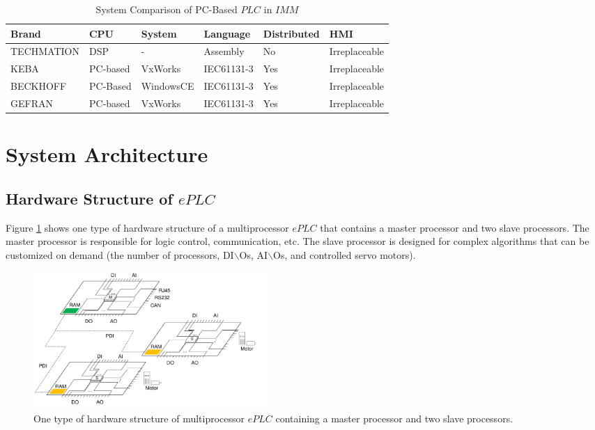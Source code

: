 \documentclass[journal,UTF8]{IEEEtran}
\begin{document}
	\begin{table}
		\scriptsize \caption{System Comparison of PC-Based $PLC$ in $IMM$}
		\label{table:IMMControllor}
		\begin{center}
			\renewcommand{\arraystretch}{1.4}
			\setlength\tabcolsep{3pt}
			\begin{tabular}{|p{1.6cm}|p{1cm}|p{1.2cm}|p{1.4cm}|p{1.1cm}|p{1.3cm}|}
				\hline
				Brand       & CPU       & System & Language       & Distributed & HMI\\
				\hline
				TECHMATION  & DSP       & -  & Assembly  &No           & Irreplaceable \\
				\hline
				KEBA        & PC-based  &VxWorks   & IEC61131-3   &Yes          & Irreplaceable\\
				\hline
				BECKHOFF    & PC-Based  &WindowsCE & IEC61131-3  &Yes          &Irreplaceable\\
				\hline
				GEFRAN      & PC-based  &VxWorks   &IEC61131-3     &Yes          &Irreplaceable\\
				\hline
			\end{tabular}
		\end{center}
	\end{table}
	\section{System Architecture}
	\label{MultiProcessorePLC}
	\subsection{Hardware Structure of $ePLC$}
	Figure \ref{fig:HardwareStructure} shows one type of hardware structure of a multiprocessor $ePLC$ that contains a master processor and two slave processors. The master processor is responsible for logic control, communication, etc. The slave processor is designed for complex algorithms that can be customized on demand (the number of processors, DI$\backslash$Os, AI$\backslash$Os, and controlled servo motors).
	\begin{figure}
		\centering
		\includegraphics[width=3.5in]{fig/FIG2.pdf}
		\caption{ One type of hardware structure of multiprocessor $ePLC$ containing a master processor and two slave processors.}
		\label{fig:HardwareStructure}
	\end{figure}
\end{document}
